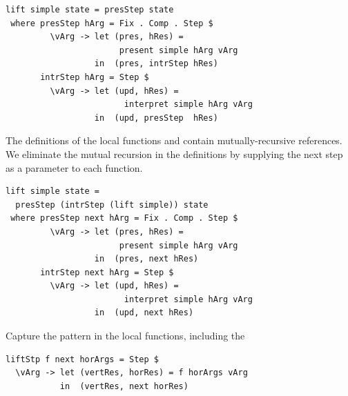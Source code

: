 \documentclass[preprint,natbib]{sigplanconf}
\begin{document}
\begin{small} %
\begin{verbatim}
lift simple state = presStep state 
 where presStep hArg = Fix . Comp . Step $
         \vArg -> let (pres, hRes) = 
                       present simple hArg vArg
                  in  (pres, intrStep hRes)
       intrStep hArg = Step $
         \vArg -> let (upd, hRes) = 
                        interpret simple hArg vArg
                  in  (upd, presStep  hRes)
\end{verbatim}
\end{small}

The definitions of the local functions  and  contain mutually-recursive references. We eliminate the mutual recursion in the definitions by supplying the next step as a parameter to each function.

      
      
\begin{small} %
\begin{verbatim}
lift simple state =
  presStep (intrStep (lift simple)) state
 where presStep next hArg = Fix . Comp . Step $
         \vArg -> let (pres, hRes) = 
                       present simple hArg vArg
                  in  (pres, next hRes)
       intrStep next hArg = Step $
         \vArg -> let (upd, hRes) = 
                        interpret simple hArg vArg
                  in  (upd, next hRes)
\end{verbatim}
\end{small}

Capture the pattern in the local functions, including the 

\begin{small} %
\begin{verbatim}
liftStp f next horArgs = Step $ 
  \vArg -> let (vertRes, horRes) = f horArgs vArg
           in  (vertRes, next horRes)
\end{verbatim}%
\end{small}
\end{document}
